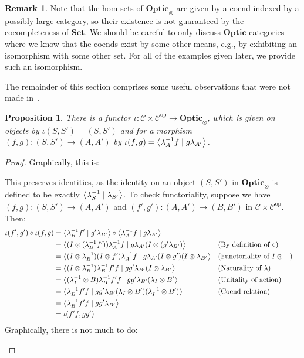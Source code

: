 \documentclass[11pt,a4paper]{article}
\theoremstyle{plain}
\newtheorem{proposition}[theorem]{Proposition}
\theoremstyle{definition}
\newtheorem{remark}[theorem]{Remark}
\newcommand{\C}{\mathscr{C}}
\newcommand{\Set}{\mathbf{Set}}
\newcommand{\Optic}{\mathbf{Optic}}
\newcommand{\op}{\mathrm{op}}
\newcommand{\rep}[2]{{\ensuremath \left\langle #1 \mid #2 \right\rangle}}
\begin{document}
\begin{remark}
  Note that the hom-sets of $\Optic_\otimes$ are given by a coend indexed by a possibly large category, so their existence is not guaranteed by the cocompleteness of $\Set$. We should be careful to only discuss $\Optic$ categories where we know that the coends exist by some other means, e.g., by exhibiting an isomorphism with some other set. For all of the examples given later, we provide such an isomorphism.
\end{remark}

The remainder of this section comprises some useful observations that were not made in~\cite{Doubles}.

\begin{proposition}
  There is a functor $\iota : \C \times \C^\op \to \Optic_\otimes$, which is given on objects by $\iota(S, S') = (S, S')$ and for a morphism $(f, g) : (S, S') \to (A, A')$ by $\iota(f, g) = \rep{\lambda_A^{-1} f}{g \lambda_{A'}}$.
\end{proposition}
\begin{proof}
  Graphically, this is:
  \begin{center}
    
  \end{center}

  This preserves identities, as the identity on an object $(S, S')$ in $\Optic_\otimes$ is defined to be exactly $\rep{\lambda^{-1}_S}{\lambda_{S'}}$. To check functoriality, suppose we have $(f, g) : (S, S') \to (A, A')$ and $(f', g') : (A, A') \to (B, B')$ in $\C \times \C^\op$. Then:
  \begin{align*}
    \iota(f', g') \circ \iota(f, g)
    &= \rep{\lambda^{-1}_B f'}{g' \lambda_{B'}} \circ \rep{\lambda^{-1}_A f}{g \lambda_{A'}} \\
    &= \rep{(I\otimes (\lambda^{-1}_B f'))\lambda^{-1}_A f}{g \lambda_{A'} (I\otimes (g' \lambda_{B'})} && \text{(By definition of $\circ$)}\\
    &= \rep{(I \otimes \lambda^{-1}_B) (I \otimes f')\lambda^{-1}_A f}{g \lambda_{A'} (I \otimes g')(I\otimes \lambda_{B'}} && \text{(Functoriality of $I \otimes -$)}\\
    &= \rep{(I\otimes \lambda^{-1}_B) \lambda^{-1}_B f' f}{g g' \lambda_{B'} (I\otimes \lambda_{B'}} && \text{(Naturality of $\lambda$)}\\
    &= \rep{(\lambda^{-1}_I \otimes B) \lambda^{-1}_B f' f}{g g' \lambda_{B'} (\lambda_I \otimes B'} && \text{(Unitality of action)} \\
    &= \rep{\lambda^{-1}_B f' f}{g g' \lambda_{B'} (\lambda_I \otimes B') (\lambda^{-1}_I \otimes B')} && \text{(Coend relation)}  \\
    &= \rep{\lambda^{-1}_B f'f}{g g' \lambda_{B'}} \\
    &= \iota(f'f, gg')
  \end{align*}
  Graphically, there is not much to do:
  \begin{center}
    
    \qquad \raisebox{0.3cm}{$=$} \qquad
    
  \end{center}

\end{proof}
\end{document}

